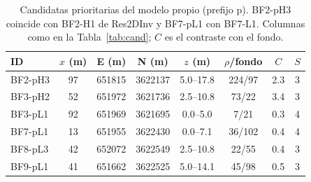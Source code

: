 \documentclass[conference]{IEEEtran}
\begin{document}
\begin{table}[!t]
\caption{Candidatas prioritarias del modelo propio (prefijo p). BF2-pH3 coincide con BF2-H1 de Res2DInv y BF7-pL1 con BF7-L1. Columnas como en la Tabla~\ref{tab:cand}; $C$ es el contraste con el fondo.}
\label{tab:prop}
\centering\footnotesize
\setlength{\tabcolsep}{2.6pt}
\begin{tabular}{lccccccc}
\toprule
ID & $x$ (m) & E (m) & N (m) & $z$ (m) & $\rho$/fondo & $C$ & $S$ \\
\midrule
BF2-pH3 & 97 & 651815 & 3622137 & 5.0--17.8 & 224/97 & 2.3 & 3 \\
BF3-pH2 & 52 & 651972 & 3621736 & 2.5--10.8 & 73/22 & 3.4 & 3 \\
BF3-pL1 & 92 & 651969 & 3621695 & 0.0--5.0 & 7/21 & 0.3 & 4 \\
BF7-pL1 & 13 & 651955 & 3622430 & 0.0--7.1 & 36/102 & 0.4 & 4 \\
BF8-pL3 & 42 & 652072 & 3622549 & 2.5--10.8 & 22/55 & 0.4 & 3 \\
BF9-pL1 & 41 & 651662 & 3622525 & 5.0--14.1 & 45/98 & 0.5 & 3 \\
\bottomrule
\end{tabular}
\end{table}
\end{document}
